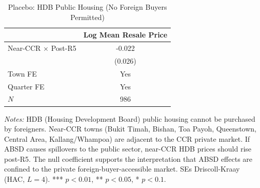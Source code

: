 \begin{table}[htbp]
\centering
\caption{Placebo: HDB Public Housing (No Foreign Buyers Permitted)}\label{tab:placebo}
\begin{threeparttable}
\begin{tabular}{lc}
\toprule
 & Log Mean Resale Price \\
\midrule
Near-CCR $\times$ Post-R5 & -0.022 \\
 & (0.026) \\
\midrule
Town FE & Yes \\
Quarter FE & Yes \\
$N$ & 986 \\
\bottomrule
\end{tabular}
\begin{tablenotes}[flushleft]\small
\item \textit{Notes:} HDB (Housing Development Board) public housing cannot be purchased by foreigners. Near-CCR towns (Bukit Timah, Bishan, Toa Payoh, Queenstown, Central Area, Kallang/Whampoa) are adjacent to the CCR private market. If ABSD causes spillovers to the public sector, near-CCR HDB prices should rise post-R5. The null coefficient supports the interpretation that ABSD effects are confined to the private foreign-buyer-accessible market. SEs Driscoll-Kraay (HAC, $L=4$). *** $p<0.01$, ** $p<0.05$, * $p<0.1$.
\end{tablenotes}
\end{threeparttable}
\end{table}

